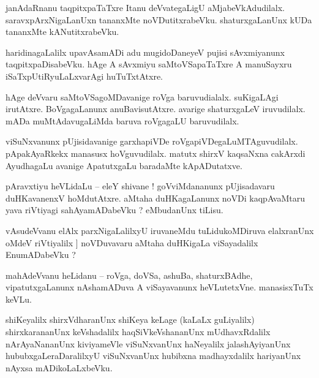 \documentclass{article}
\begin{document}
\begin{mn}%
janAdaRnanu taqpitxpaTaTxre Itanu deVvategaLigU aMjabeVkAdudilalx. saravxpArxNigaLanUxn tananxMte 
noVDutitxrabeVku. shaturxgaLanUnx kUDa tananxMte kANutitxrabeVku.
\end{mn}

\begin{mn}%
haridinagaLalilx upavAsamADi adu mugidoDaneyeV pujisi sAvxmiyanunx taqpitxpaDisabeVku. hAge A 
sAvxmiyu saMtoVSapaTaTxre A manuSayxru iSaTxpUtiRyuLaLxvarAgi huTuTxtAtxre.
\end{mn}

\begin{mn}%
hAge deVvaru saMtoVSagoMDavanige roVga baruvudialalx. suKigaLAgi irutAtxre. BoVgagaLanunx 
anuBavisutAtxre. avarige shaturxgaLeV iruvudilalx. mADa muMtAdavugaLiMda baruva roVgagaLU 
baruvudilalx.
\end{mn}

\begin{mn}%
viSuNxvanunx pUjisidavanige garxhapiVDe roVgapiVDegaLuMTAguvudilalx. pApakAyaRkekx manasusx 
hoVguvudilalx. matutx shirxV kaqsaNxna cakArxdi AyudhagaLu avanige ApatutxgaLu baradaMte 
kApADutatxve.
\end{mn}

\begin{mn}%
pAravxtiyu heVLidaLu -- eleY shivane ! goVviMdananunx pUjisadavaru duHKavanenxV hoMdutAtxre. aMtaha 
duHKagaLanunx noVDi kaqpAvaMtaru yava riVtiyagi sahAyamADabeVku ? eMbudanUnx tiLisu.
\end{mn}

\begin{mn}%
vAsudeVvanu elAlx parxNigaLalilxyU iruvaneMdu tuLidukoMDiruva elalxranUnx oMdeV riVtiyalilx ]
noVDuvavaru aMtaha duHKigaLa viSayadalilx EnumADabeVku ?
\end{mn}

\begin{mn}%
mahAdeVvanu heLidanu -- roVga, doVSa, ashuBa, shaturxBAdhe, vipatutxgaLanunx nAshamADuva A 
viSayavanunx heVLutetxVne. manasisxTuTx keVLu.
\end{mn}

\begin{mn}%
shiKeyalilx shirxVdharanUnx shiKeya keLage (kaLaLx guLiyalilx) shirxkarananUnx keVshadalilx 
haqSiVkeVshananUnx mUdhavxRdalilx nArAyaNananUnx kiviyameVle viSuNxvanUnx haNeyalilx 
jalashAyiyanUnx hububxgaLeraDaralilxyU viSuNxvanUnx hubibxna madhayxdalilx hariyanUnx nAyxsa 
mADikoLaLxbeVku.
\end{mn}
\end{document}
